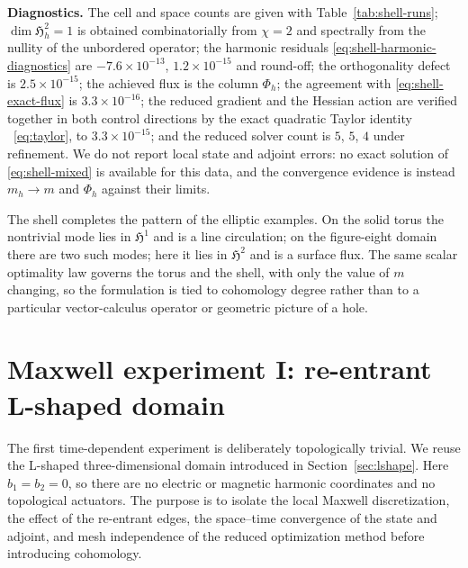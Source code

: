 \documentclass{article}
\newcommand{\HH}{\mathfrak H}
\begin{document}
 
\medskip
\noindent\textbf{Diagnostics.}
The cell and space counts are given with Table~\ref{tab:shell-runs};
$\dim\HH^2_h=1$ is obtained combinatorially from $\chi=2$ and
spectrally from the nullity of the unbordered operator; the harmonic
residuals \eqref{eq:shell-harmonic-diagnostics} are
$-7.6\times10^{-13}$, $1.2\times10^{-15}$ and round-off; the
orthogonality defect is $2.5\times10^{-15}$; the achieved flux is the
column $\Phi_h$; the agreement with \eqref{eq:shell-exact-flux} is
$3.3\times10^{-16}$; the reduced gradient and the Hessian action are
verified together in both control directions by the exact quadratic
Taylor identity ~\ref{eq:taylor}, to $3.3\times10^{-15}$;
and the reduced solver count is $5$, $5$, $4$ under refinement. We do
not report local state and adjoint errors: no exact solution of
\eqref{eq:shell-mixed} is available for this data, and the convergence
evidence is instead $m_h\to m$ and $\Phi_h$ against their limits.
 
The shell completes the pattern of the elliptic examples. On the solid
torus the nontrivial mode lies in $\HH^1$ and is a line circulation; on
the figure-eight domain there are two such modes; here it lies in
$\HH^2$ and is a surface flux. The same scalar optimality law governs
the torus and the shell, with only the value of $m$ changing, so the
formulation is tied to cohomology degree rather than to a particular
vector-calculus operator or geometric picture of a hole.
 






\section{Maxwell experiment I: re-entrant L-shaped domain}
\label{sec:maxwell-lshape-numerics}

The first time-dependent experiment is deliberately topologically trivial.  We reuse the L-shaped three-dimensional domain introduced in Section~\ref{sec:lshape}.  Here $b_1=b_2=0$, so there are no electric or magnetic harmonic coordinates and no topological actuators.  The purpose is to isolate the local Maxwell discretization, the effect of the re-entrant edges, the space--time convergence of the state and adjoint, and mesh independence of the reduced optimization method before introducing cohomology.
\end{document}

